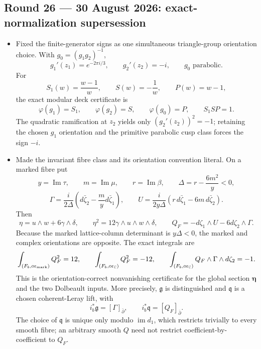 \subsection*{Round 26 --- 30 August 2026: exact-normalization supersession}

\begin{itemize}[leftmargin=1.8em]
\item Fixed the finite-generator signs as one simultaneous triangle-group
orientation choice.  With \(g_0=(g_1g_2)^{-1}\),
\[
 g_1'(z_1)=e^{-2\pi i/3},\qquad g_2'(z_2)=-i,\qquad
 g_0\text{ parabolic}.
\]
For
\[
 S_1(w)=\frac{w-1}{w},\qquad S(w)=-\frac1w,\qquad P(w)=w-1,
\]
the exact modular deck certificate is
\[
 \varphi(g_1)=S_1,\qquad\varphi(g_2)=S,\qquad
 \varphi(g_0)=P,\qquad S_1SP=1.
\]
The quadratic ramification at \(z_2\) yields only
\((g_2'(z_2))^2=-1\); retaining the chosen \(g_1\) orientation and the
primitive parabolic cusp class forces the sign \(-i\).

\item Made the invariant fibre class and its orientation convention literal.
On a marked fibre put
\[
 y=\operatorname{Im}\tau,\qquad m=\operatorname{Im}\mu,\qquad
 r=\operatorname{Im}\beta,\qquad
 \Delta=r-\frac{6m^2}{y}<0,
\]
\[
 \Gamma=\frac{i}{2\Delta}
 \left(d\bar\zeta_2-\frac{m}{y}d\bar\zeta_1\right),\qquad
 U=\frac{i}{2y\Delta}
 \left(r\,d\bar\zeta_1-6m\,d\bar\zeta_2\right).
\]
Then
\[
 \eta=u\wedge w+6\gamma\wedge\delta,\qquad
 \eta^2=12\gamma\wedge u\wedge w\wedge\delta,\qquad
 Q_F=-d\zeta_1\wedge U-6d\zeta_2\wedge\Gamma.
\]
Because the marked lattice-column determinant is \(y\Delta<0\), the marked
and complex orientations are opposite.  The exact integrals are
\[
 \int_{(F_b,\mathrm{or}_{\rm mark})}Q_F^2=12,\qquad
 \int_{(F_b,\mathrm{or}_{\mathbb C})}Q_F^2=-12,\qquad
 \int_{(F_b,\mathrm{or}_{\mathbb C})}
 Q_F\wedge\Gamma\wedge d\zeta_2=-1.
\]
This is the orientation-correct nonvanishing certificate for the global
section \(\boldsymbol\eta\) and the two Dolbeault inputs.  More precisely,
\(\mathfrak g\) is distinguished and \(\mathfrak q\) is a chosen
coherent-Leray lift, with
\[
 i_b^*\mathfrak g=[\Gamma]_{\bar\partial},\qquad
 i_b^*\mathfrak q=[Q_F]_{\bar\partial}.
\]
The choice of \(\mathfrak q\) is unique only modulo
\(\operatorname{im}d_1\), which restricts trivially to every smooth fibre;
an arbitrary smooth \(Q\) need not restrict coefficient-by-coefficient to
\(Q_F\).


\end{itemize}
